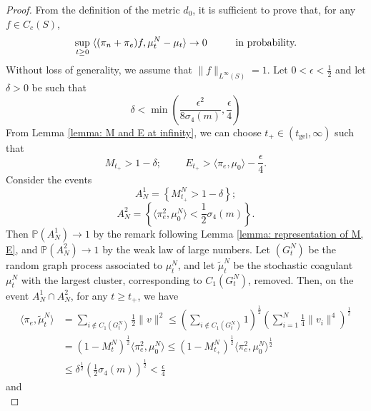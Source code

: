 \begin{proof} From the definition of the metric $d_0$, it is sufficient to prove that, for any $f\in C_c(S)$, \begin{equation}
    \sup_{t\geq 0}\hspace{0.1cm} \langle(\pi_n+\pi_e)f, \mu^N_t-\mu_t \rangle \rightarrow 0 \hspace{1cm} \text{in probability.}
\end{equation} Without loss of generality, we assume that $\|f\|_{L^\infty(S)}=1.$ Let $0<\epsilon<\frac{1}{2}$ and let $\delta>0$ be such that \begin{equation}
    \delta< \min\left(\frac{\epsilon^2}{8\sigma_4(m)}, \frac{\epsilon}{4}\right)
\end{equation}
    From Lemma \ref{lemma: M and E at infinity}, we can choose $t_+\in (t_\text{gel}, \infty)$ such that \begin{equation}
        M_{t_+}>1-\delta;\hspace{1cm}E_{t_+}>\langle \pi_e, \mu_0\rangle -\frac{\epsilon}{4}. 
    \end{equation}Consider the events
    \begin{equation}
        A^1_N=\left\{M^N_{t_+}>1-\delta \right\};
    \end{equation}
    \begin{equation} A^2_N = \left \{\langle \pi_e^2, \mu^N_0\rangle <\frac{1}{2}\sigma_4(m)\right\}.\end{equation} Then $\mathbb{P}(A^1_N)\rightarrow 1$ by the remark following Lemma \ref{lemma: representation of M, E}, and $\mathbb{P}(A^2_N)\rightarrow 1$ by the weak law of large numbers. Let $(G^N_t)$ be the random graph process associated to $\mu^N_t$, and let $\widetilde{\mu}^N_t$ be the stochastic coagulant $\mu^N_t$ with the largest cluster, corresponding to $C_1(G^N_t)$, removed.  Then, on the event $A^1_N\cap A^2_N$, for any $t\geq t_+$, we have \begin{equation} \begin{split}
\langle \pi_e, \widetilde{\mu}^N_t\rangle & =\sum_{i\not \in C_1(G^N_t)}\frac{1}{2}\|v\|^2 \leq \left(\sum_{i \not\in C_1(G^N_t)} 1 \right)^\frac{1}{2} \left(\sum_{i =1}^N \frac{1}{4}\|v_i\|^4 \right)^\frac{1}{2}\\[2ex] & =(1-M^N_t)^\frac{1}{2} \langle \pi_e^2, \mu^N_0\rangle  \leq (1-M^N_{t_+})^\frac{1}{2}\langle \pi_e^2, \mu^N_0\rangle ^\frac{1}{2} \\[2ex] &\leq \delta^\frac{1}{2} \left(\frac{1}{2}\sigma_4(m)\right)^\frac{1}{2}<\frac{\epsilon}{4} \end{split} \end{equation} and \begin{equation}

\end{equation}
\end{proof}
